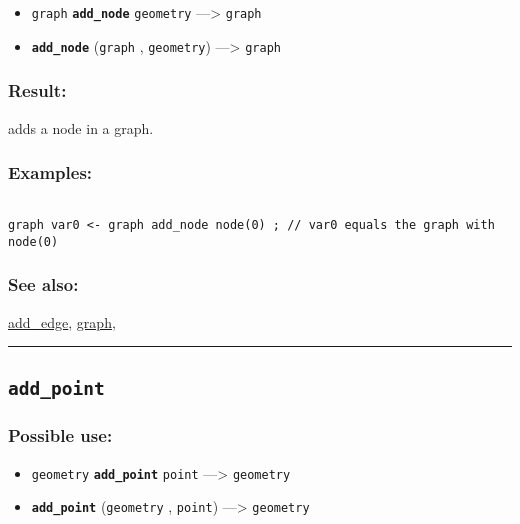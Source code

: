 \documentclass[]{book}
\providecommand{\tightlist}{%
  \setlength{\itemsep}{0pt}\setlength{\parskip}{0pt}}
\theoremstyle{definition}
\theoremstyle{definition}
\theoremstyle{definition}
\theoremstyle{remark}
\begin{document}
\begin{itemize}
\tightlist
\item
  \texttt{graph} \textbf{\texttt{add\_node}} \texttt{geometry}
  ---\textgreater{} \texttt{graph}
\item
  \textbf{\texttt{add\_node}} (\texttt{graph} , \texttt{geometry})
  ---\textgreater{} \texttt{graph}
\end{itemize}

\subsubsection{Result:}\label{result-20}

adds a node in a graph.

\subsubsection{Examples:}\label{examples-16}

\begin{verbatim}
 
graph var0 <- graph add_node node(0) ; // var0 equals the graph with node(0)
\end{verbatim}

\subsubsection{See also:}\label{see-also-17}

\href{OperatorsAA\#add_edge}{add\_edge},
\href{OperatorsDH\#graph}{graph},

\begin{center}\rule{0.5\linewidth}{\linethickness}\end{center}

\subsection{\texorpdfstring{\texttt{add\_point}}{add\_point}}\label{add_point}

\subsubsection{Possible use:}\label{possible-use-22}

\begin{itemize}
\tightlist
\item
  \texttt{geometry} \textbf{\texttt{add\_point}} \texttt{point}
  ---\textgreater{} \texttt{geometry}
\item
  \textbf{\texttt{add\_point}} (\texttt{geometry} , \texttt{point})
  ---\textgreater{} \texttt{geometry}
\end{itemize}
\end{document}
